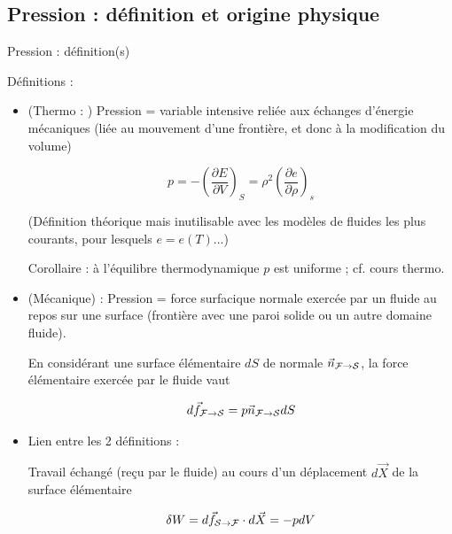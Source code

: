 
\subsection{Pression : définition et origine physique}


\begin{frame}{Pression : définition(s)}

Définitions : 

\begin{itemize}[<+-| alert@+>]
\item (Thermo : ) Pression = variable intensive reliée aux échanges d'énergie mécaniques 
(liée au mouvement d'une frontière, et donc à la modification du volume) 

$$
p = - {\left( \frac{\partial E}{\partial V} \right)}_{S} = \rho^2 {\left( \frac{\partial e}{\partial \rho} \right)}_{s} 
$$  


(Définition théorique mais inutilisable avec les modèles de fluides les plus courants, pour lesquels $e = e(T)...$)

Corollaire : à l'équilibre thermodynamique $p$ est uniforme ; cf. cours thermo.


\item (Mécanique) : Pression = force surfacique normale exercée par un fluide au repos sur une surface 
(frontière avec une paroi solide ou un autre domaine fluide).

En considérant une surface élémentaire $dS$ de normale $\vec{n}_{{\cal F} \rightarrow {\cal S} }$, la force élémentaire exercée par le fluide vaut 

$$
d \vec{f}_{{\cal F} \rightarrow {\cal S} } = p  \vec{n}_{{\cal F} \rightarrow {\cal S} } d S
$$

\item Lien entre les 2 définitions :

Travail échangé (reçu par le fluide)  au cours d'un déplacement $d \vec{X}$ de la surface élémentaire

$$
\delta W = d \vec{f}_{{\cal S} \rightarrow {\cal F} }  \cdot d \vec{X} = - p d V
$$

\end{itemize}


\end{frame}



